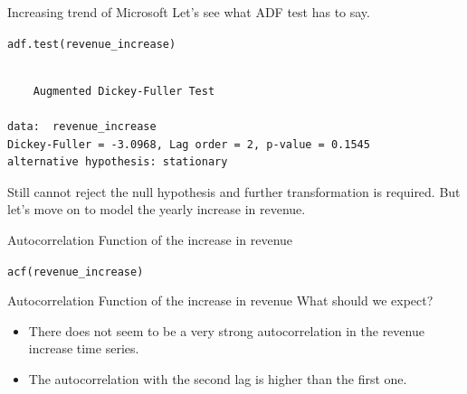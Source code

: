 \documentclass{beamer}\usepackage[]{graphicx}\usepackage[]{color}
\makeatletter
\newcommand{\hlstd}[1]{\textcolor[rgb]{1,0.894,0.769}{#1}}%
\newcommand{\hlkwd}[1]{\textcolor[rgb]{1,0.78,0.769}{#1}}%
\newenvironment{kframe}{%
 \def\at@end@of@kframe{}%
 \ifinner\ifhmode%
  \def\at@end@of@kframe{\end{minipage}}%
  \begin{minipage}{\columnwidth}%
 \fi\fi%
 \def\FrameCommand##1{\hskip\@totalleftmargin \hskip-\fboxsep
 \colorbox{shadecolor}{##1}\hskip-\fboxsep
     \hskip-\linewidth \hskip-\@totalleftmargin \hskip\columnwidth}%
 \MakeFramed {\advance\hsize-\width
   \@totalleftmargin\z@ \linewidth\hsize
   \@setminipage}}%
 {\par\unskip\endMakeFramed%
 \at@end@of@kframe}
\newenvironment{knitrout}{}{} %
\makeatother
\begin{document}
\begin{darkframes}
    
    
    
    \begin{frame}[fragile]{Increasing trend of Microsoft}
    \fontsize{9}{9}\selectfont
      Let's see what ADF test has to say. \pause
    \bigskip
\begin{knitrout}
\begin{kframe}
\begin{alltt}
\hlkwd{adf.test}\hlstd{(revenue_increase)}
\end{alltt}
\begin{verbatim}

	Augmented Dickey-Fuller Test

data:  revenue_increase
Dickey-Fuller = -3.0968, Lag order = 2, p-value = 0.1545
alternative hypothesis: stationary
\end{verbatim}
\end{kframe}
\end{knitrout}
      \pause
      
      Still cannot reject the null hypothesis and further transformation is required. But let's move on to model the yearly increase in revenue.
    \end{frame}
    
      
    
    
    \begin{frame}[fragile]{Autocorrelation Function of the increase in revenue}  
      \fontsize{8}{8}\selectfont
      
\begin{knitrout}
\begin{kframe}
\begin{alltt}
\hlkwd{acf}\hlstd{(revenue_increase)}
\end{alltt}
\end{kframe}


\end{knitrout}
    \end{frame}
    
    
    \begin{frame}[fragile]{Autocorrelation Function of the increase in revenue}       \fontsize{9}{9}\selectfont
      What should we expect?
      \begin{itemize}
        \item There does not seem to be a very strong autocorrelation in the revenue increase time series.
        \item The autocorrelation with the second lag is higher than the first one.
      \end{itemize}
      

\end{frame}
\end{darkframes}
\end{document}
